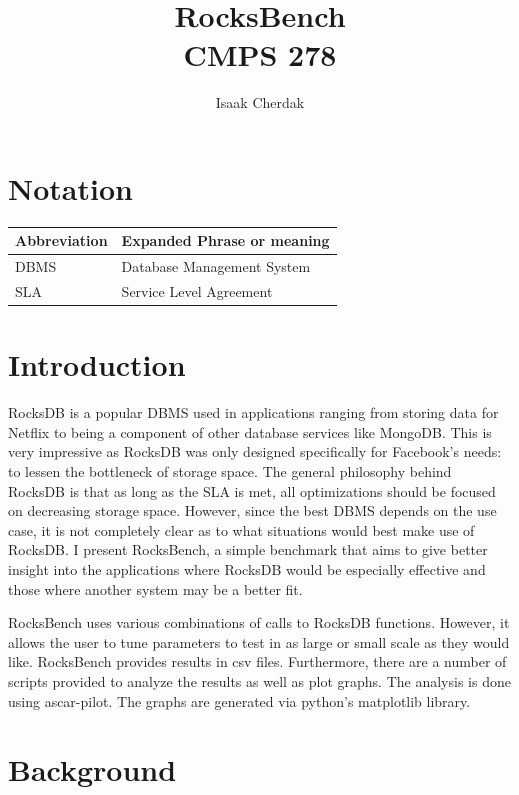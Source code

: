 \documentclass[twocolumn,11pt]{article}
\title{RocksBench\\CMPS 278}
\author{Isaak Cherdak}
\begin{document}
\maketitle

\pagebreak

\section*{Notation}

\begin{center}
  \begin{tabular}{ | l | l | }
    \hline
    Abbreviation & Expanded Phrase or meaning\\ \hline \hline
    DBMS & Database Management System\\ \hline
    SLA & Service Level Agreement\\ \hline
  \end{tabular}
\end{center}

\section{Introduction}
\label{sec:overview}

RocksDB is a popular DBMS used in applications ranging from storing data for
Netflix to being a component of other database services like MongoDB. This is
very impressive as RocksDB was only designed specifically for Facebook's needs:
to lessen the bottleneck of storage space. The general philosophy behind RocksDB
is that as long as the SLA is met, all optimizations should be focused on
decreasing storage space. However, since the best DBMS depends on the use
case\cite{278:lecture}, it is not completely clear as to what situations
would best make use of RocksDB. I present RocksBench, a simple benchmark that
aims to give better insight into the applications where RocksDB would be
especially effective and those where another system may be a better fit.

RocksBench uses various combinations of calls to RocksDB functions. However, it
allows the user to tune parameters to test in as large or small scale as they
would like. RocksBench provides results in csv files. Furthermore, there are a
number of scripts provided to analyze the results as well as plot graphs. The
analysis is done using ascar-pilot\cite{li:pilot}. The graphs are generated via
python's matplotlib library.

\section{Background}
\label{sec:background}
\end{document}
